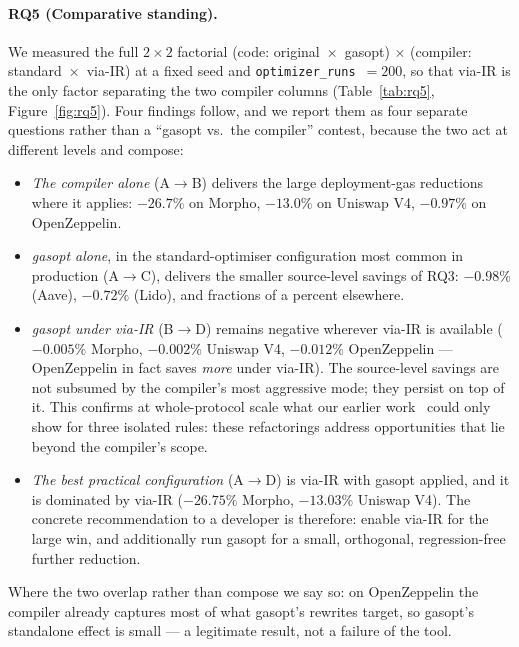 \paragraph{RQ5 (Comparative standing).}
We measured the full $2\times2$ factorial (code: original~$\times$~gasopt) $\times$
(compiler: standard~$\times$~via-IR) at a fixed seed and \texttt{optimizer\_runs}~$=200$, so
that via-IR is the only factor separating the two compiler columns (Table~\ref{tab:rq5},
Figure~\ref{fig:rq5}). Four findings follow, and we report them as four separate questions
rather than a ``gasopt vs.\ the compiler'' contest, because the two act at different levels
and compose:
\begin{itemize}
\item \emph{The compiler alone} (A$\to$B) delivers the large deployment-gas reductions where
it applies: $-26.7\%$ on Morpho, $-13.0\%$ on Uniswap V4, $-0.97\%$ on OpenZeppelin.
\item \emph{gasopt alone}, in the standard-optimiser configuration most common in production
(A$\to$C), delivers the smaller source-level savings of RQ3: $-0.98\%$ (Aave), $-0.72\%$
(Lido), and fractions of a percent elsewhere.
\item \emph{gasopt under via-IR} (B$\to$D) remains negative wherever via-IR is available
($-0.005\%$ Morpho, $-0.002\%$ Uniswap V4, $-0.012\%$ OpenZeppelin --- OpenZeppelin in fact
saves \emph{more} under via-IR). The source-level savings are not subsumed by the compiler's
most aggressive mode; they persist on top of it. This confirms at whole-protocol scale what
our earlier work~\cite{ensuringgasoptimisation} could only show for three isolated rules:
these refactorings address opportunities that lie beyond the compiler's scope.
\item \emph{The best practical configuration} (A$\to$D) is via-IR with gasopt applied, and it
is dominated by via-IR ($-26.75\%$ Morpho, $-13.03\%$ Uniswap V4). The concrete recommendation
to a developer is therefore: enable via-IR for the large win, and additionally run gasopt for
a small, orthogonal, regression-free further reduction.
\end{itemize}
Where the two overlap rather than compose we say so: on OpenZeppelin the compiler already
captures most of what gasopt's rewrites target, so gasopt's standalone effect is small --- a
legitimate result, not a failure of the tool.
